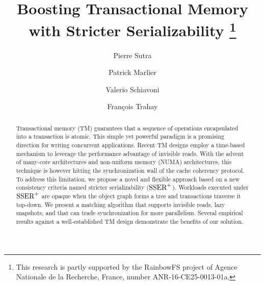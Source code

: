 \documentclass[runningheads]{llncs}
\begin{document}
{ \newcommand{\mynote}[3]{
   \fbox{\bfseries\sffamily\scriptsize#1}
   {\small$\blacktriangleright$\textsf{\emph{\color{#3}{#2}}}$\blacktriangleleft$}}}
{ \newcommand{\mynote}[3]{}}
\newcommand{\pf}[1]{\mynote{Pierre}{#1}{red}}
\newcommand{\hm}[1]{\mynote{Patrick}{#1}{pink}}
\newcommand{\vs}[1]{\mynote{Valerio}{#1}{blue}}
\newcommand{\ft}[1]{\mynote{Francois}{#1}{green}}


\title{Boosting Transactional Memory\\with Stricter Serializability%
  \thanks{
    This research is partly supported by the RainbowFS project of Agence Nationale de la Recherche, France, number ANR-16-CE25-0013-01a.
  }
}

\author{Pierre Sutra \and Patrick Marlier \and
 Valerio Schiavoni \and Fran\c{c}ois Trahay}

\maketitle

\begin{abstract}
  Transactional memory (TM) guarantees that a sequence of operations encapsulated into a transaction is atomic.
  This simple yet powerful paradigm is a promising direction for writing concurrent applications.
  Recent TM designs employ a time-based mechanism to leverage the performance advantage of invisible reads.
  With the advent of many-core architectures and non-uniform memory (NUMA) architectures, this technique is however hitting the synchronization wall of the cache coherency protocol.
  To address this limitation, we propose a novel and flexible approach based on a new consistency criteria named stricter serializability ($\SPSER$).
  Workloads executed under $\SPSER$ are opaque when the object graph forms a tree and transactions traverse it top-down.  
  We present a matching algorithm that supports invisible reads, lazy snapshots, and that can trade synchronization for more parallelism.
  Several empirical results against a well-established TM design demonstrate the benefits of our solution.
\end{abstract}




%




{
  
  
}  
\end{document}
